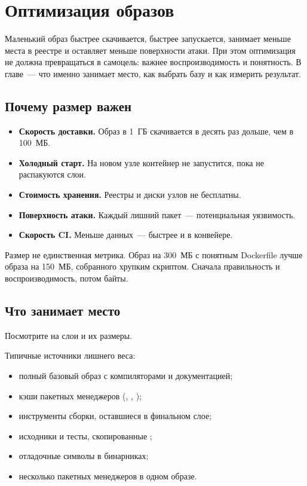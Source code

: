 \chapter{Оптимизация образов}

Маленький образ быстрее скачивается, быстрее запускается, занимает
меньше места в реестре и оставляет меньше поверхности атаки. При этом
оптимизация не должна превращаться в самоцель: важнее
воспроизводимость и понятность. В главе~--- что именно занимает место,
как выбрать базу и как измерить результат.

\section{Почему размер важен}

\begin{itemize}
  \item \textbf{Скорость доставки.} Образ в 1~ГБ скачивается
        в десять раз дольше, чем в 100~МБ.
  \item \textbf{Холодный старт.} На новом узле контейнер не запустится,
        пока не распакуются слои.
  \item \textbf{Стоимость хранения.} Реестры и диски узлов не бесплатны.
  \item \textbf{Поверхность атаки.} Каждый лишний пакет~--- потенциальная
        уязвимость.
  \item \textbf{Скорость CI.} Меньше данных~--- быстрее 
        и  в конвейере.
\end{itemize}

\begin{notebox}
Размер не единственная метрика. Образ на 300~МБ с понятным
Dockerfile лучше образа на 150~МБ, собранного хрупким скриптом.
Сначала правильность и воспроизводимость, потом байты.
\end{notebox}

\section{Что занимает место}

Посмотрите на слои и их размеры.


Типичные источники лишнего веса:

\begin{itemize}
  \item полный базовый образ с компиляторами и документацией;
  \item кэши пакетных менеджеров (,
        , );
  \item инструменты сборки, оставшиеся в финальном слое;
  \item исходники и тесты, скопированные ;
  \item отладочные символы в бинарниках;
  \item несколько пакетных менеджеров в одном образе.
\end{itemize}

